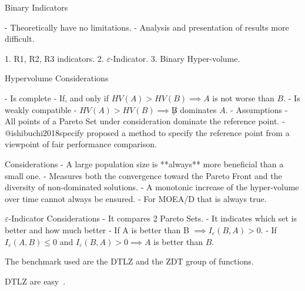 Binary Indicators

- Theoretically have no limitations.
- Analysis and presentation of results more difficult.

1. R1, R2, R3 indicators.
2. $\varepsilon$-Indicator.
3. Binary Hyper-volume.

Hypervolume
Considerations

- Is complete - If, and only if $HV(A) > HV(B) \implies A$ is not worse than $B$.
- Is weakly compatible - $HV(A) > HV(B) \implies \not B$ dominates $A$.
- Assumptions - All points of a Pareto Set under consideration dominate the reference point.
- @ishibuchi2018specify proposed a method to specify the reference point from a viewpoint of fair performance comparison.

Considerations
- A large population size is **always** more beneficial than a small one.
- Measures both the convergence toward the Pareto Front and the diversity of non-dominated solutions.
- A monotonic increase of the hyper-volume over time cannot always be ensured.
- For MOEA/D that is always true.

$\varepsilon$-Indicator
Considerations
- It compares 2 Pareto Sets.
- It indicates which set is better and how much better
- If A is better than B $\implies I_{\varepsilon}(B,A) > 0$.
- If $I_{\varepsilon}(A,B) \leq 0$ and $I_{\varepsilon}(B,A) > 0 \implies A$ is better than $B$.

The benchmark used are the DTLZ and the ZDT group of functions.

DTLZ are easy~\cite{bezerra2015comparing}.


